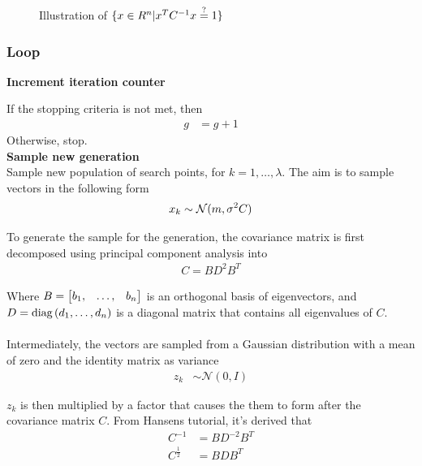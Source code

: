 \begin{figure}[H]
\begin{center}

\end{center}
\begin{center}
\ellipseFigure
\end{center}
\caption{Illustration of $\{x \in R^{n} | x^{T} C^{-1} x \stackrel{?}{=} 1\}$ \label{fig:ellipse}}
\end{figure}

\subsubsection{Loop}

\textbf{Increment iteration counter}

If the stopping criteria is not met, then
\begin{align}
g &= g+1
\end{align}
Otherwise, stop.\\


\textbf{Sample new generation}\\
Sample new population of search points, for $k = 1, \dots, \lambda$.
The aim is to sample vectors in the following form
\begin{align}
x_{k} \sim \mathcal{N}(m, \sigma^2 C)
\end{align}


To generate the sample for the generation, the covariance matrix is first 
decomposed using principal component analysis into
\begin{align}
C = B D^2 B^{T}
\end{align}

Where $B = \begin{bmatrix}
b_1, & \dots, & b_n
\end{bmatrix}$ 
is an orthogonal basis of eigenvectors, and  
$D = \text{diag}\left(d_1, \dots, d_n\right)$
is a diagonal matrix that contains all eigenvalues of $C$.\\
\\
Intermediately, the vectors are sampled from a Gaussian distribution 
with a mean of zero and
the identity matrix as variance
\begin{align}
z_{k} &\sim \mathcal{N}(0, I)
\end{align}

$z_k$ is then multiplied by a factor that causes the them to form 
after the covariance matrix $C$. From Hansens tutorial, it's derived that
\begin{align}
C^{-1} &= B D^{-2} B^{T}\\
C^{\frac{1}{2}} &= B D B^{T}
\end{align}

